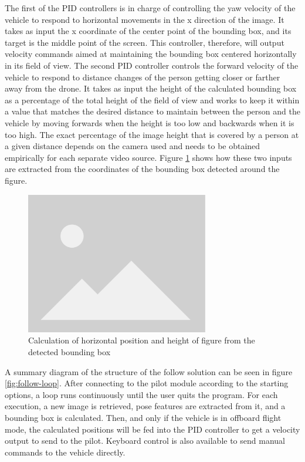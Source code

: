 The first of the PID controllers is in charge of controlling the yaw velocity of the vehicle to respond to horizontal movements in the x direction of the image.
It takes as input the x coordinate of the center point of the bounding box, and its target is the middle point of the screen.
This controller, therefore, will output velocity commands aimed at maintaining the bounding box centered horizontally in its field of view.
The second PID controller controls the forward velocity of the vehicle to respond to distance changes of the person getting closer or farther away from the drone.
It takes as input the height of the calculated bounding box as a percentage of the total height of the field of view and works to keep it within a value that matches the desired distance to maintain between the person and the vehicle by moving forwards when the height is too low and backwards when it is too high.
The exact percentage of the image height that is covered by a person at a given distance depends on the camera used and needs to be obtained empirically for each separate video source.
Figure \ref{fig:follow-input-calcs} shows how these two inputs are extracted from the coordinates of the bounding box detected around the figure.

\begin{figure}
  \centering
  \includegraphics[width=8cm, keepaspectratio]{img/placeholder.png}
  \caption{Calculation of horizontal position and height of figure from the detected bounding box}
  \label{fig:follow-input-calcs}
\end{figure}


A summary diagram of the structure of the follow solution can be seen in figure \ref{fig:follow-loop}.
After connecting to the pilot module according to the starting options, a loop runs continuously until the user quits the program.
For each execution, a new image is retrieved, pose features are extracted from it, and a bounding box is calculated.
Then, and only if the vehicle is in offboard flight mode, the calculated positions will be fed into the PID controller to get a velocity output to send to the pilot.
Keyboard control is also available to send manual commands to the vehicle directly.

